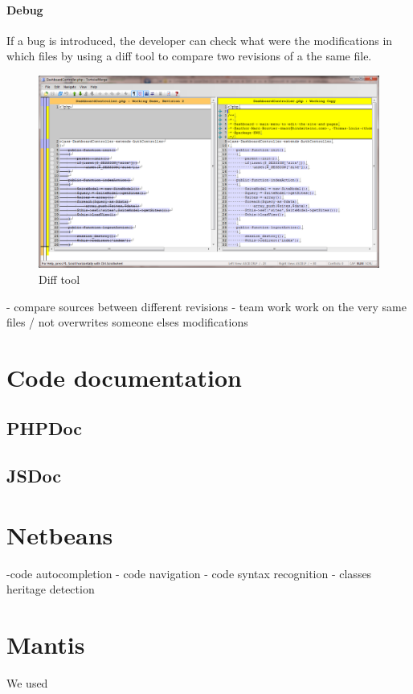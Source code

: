 \paragraph*{Debug}
If a bug is introduced, the developer can check what were the modifications in which files by using a diff tool to compare two revisions of a the same file.

\begin{figure}[!ht]
\centering
\includegraphics[width=.85\textwidth]{img/diff.png}
\caption{Diff tool}
\label{figure:diff}
\end{figure}

- compare sources between different revisions
- team work work on the very same files / not overwrites someone elses modifications

\section{Code documentation}

\subsection{PHPDoc}

\subsection{JSDoc}


\section{Netbeans}
-code autocompletion
- code navigation
- code syntax recognition
- classes heritage detection

\section{Mantis}
We used 

